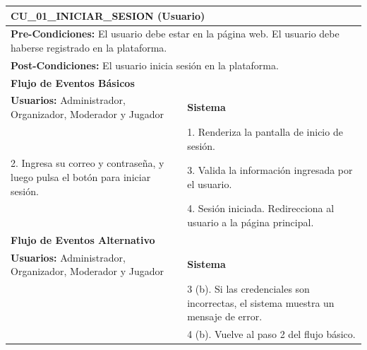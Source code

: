 \begin{center}
  \begin{tabular}{| p{7.5cm} | p{7.5cm} |}
    \hline
    \multicolumn{2}{|p{15cm}|}{\textbf{CU\_01\_INICIAR\_SESION} (Usuario)} \\ \hline
    \multicolumn{2}{|p{15cm}|}{\textbf{Pre-Condiciones:} El usuario debe estar en la página web. El usuario debe haberse registrado en la plataforma.} \\ \hline
    \multicolumn{2}{|p{15cm}|}{\textbf{Post-Condiciones:} El usuario inicia sesión en la plataforma.} \\ \hline
    \multicolumn{2}{|p{7.5cm}|}{\textbf{Flujo de Eventos Básicos}} \\ \hline
    \multicolumn{1}{|p{7.5cm}|}{\textbf{Usuarios:} Administrador, Organizador, Moderador y Jugador} & \multicolumn{1}{|p{7.5cm}|}{\textbf{Sistema}} \\ \hline
    
    \multicolumn{1}{|p{7.5cm}|}{} & 
    \multicolumn{1}{|p{7.5cm}|}{1. Renderiza la pantalla de inicio de sesión.}\\ \hline
    
    \multicolumn{1}{|p{7.5cm}|}{2. Ingresa su correo y contraseña, y luego pulsa el botón para iniciar sesión.}& 
    \multicolumn{1}{|p{7.5cm}|}{3. Valida la información ingresada por el usuario.}\\ \hline
    
    \multicolumn{1}{|p{7.5cm}|}{} & 
    \multicolumn{1}{|p{7.5cm}|}{4. Sesión iniciada. Redirecciona al usuario a la página principal.}\\ \hline
    
    \multicolumn{2}{|p{7.5cm}|}{\textbf{Flujo de Eventos Alternativo}} \\ \hline
    
    \multicolumn{1}{|p{7.5cm}|}{\textbf{Usuarios:} Administrador, Organizador, Moderador y Jugador} & \multicolumn{1}{|p{7.5cm}|}{\textbf{Sistema}} \\ \hline
    
    \multicolumn{1}{|p{7.5cm}|}{} & 
    \multicolumn{1}{|p{7.5cm}|}{3 (b). Si las credenciales son incorrectas, el sistema muestra un mensaje de error.}\\ \hline
    
    \multicolumn{1}{|p{7.5cm}|}{} & 
    \multicolumn{1}{|p{7.5cm}|}{4 (b). Vuelve al paso 2 del flujo básico.}\\ \hline
  \end{tabular}
  
  \label{table:usecase:1}
\end{center}

